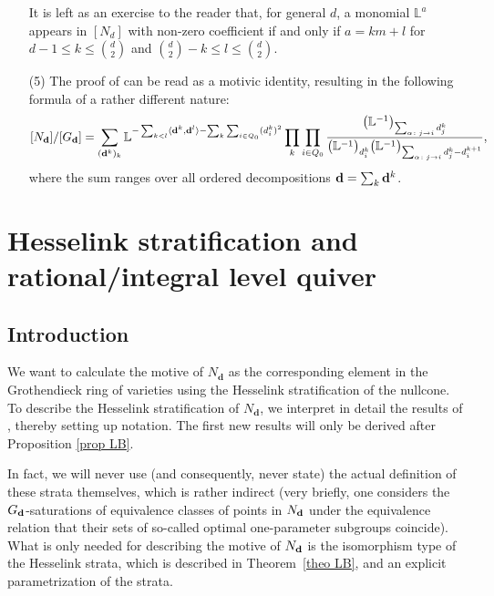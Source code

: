 \documentclass[10pt,a4paper]{amsart}
\numberwithin{equation}{section}
\theoremstyle{definition}
\begin{document}
\begin{enumerate}
It is left as an exercise to the reader that, for general $d$, a monomial $\mathbb{L}^a$ appears in $[N_d]$ with non-zero coefficient if and only if $a=km+l$ for $d-1\leq k\leq{d\choose 2}$ and ${d\choose 2}-k\leq l\leq{d\choose 2}$.
\item[(5)] The proof of \cite[Lemma~2.6]{BSV} can be read as a motivic identity, resulting in the following formula of a rather different nature:
\[[N_{\bf d}]/[G_{\bf d}]=\sum_{({\bf d}^k)_k}\mathbb{L}^{-\sum_{k<l}\langle{\bf d}^k,{\bf d}^l\rangle-\sum_k\sum_{i\in Q_0}(d^k_i)^2}\prod_k\prod_{i\in Q_0}\frac{\bigl(\mathbb{L}^{-1}\bigr)_{\sum_{\alpha\colon j\rightarrow i}d^k_j}}{\bigl(\mathbb{L}^{-1}\bigr)_{d^k_i}\bigl(\mathbb{L}^{-1}\bigr)_{\sum_{\alpha\colon j\rightarrow i}d^k_j-d^{k+1}_i}},\]
where the sum ranges over all ordered decompositions ${\bf d}=\sum_k{\bf d}^k$.
\end{enumerate}


\section{Hesselink stratification and rational/integral level quiver}\label{s4}


\subsection{Introduction}

We want to calculate the motive of $N_{\mathbf{d}}$ as the corresponding element in the Grothendieck ring of varieties using the Hesselink stratification of the nullcone. To describe the Hesselink stratification of $N_{\mathbf{d}}$, we interpret in detail the results of \cite{LB}, thereby setting up notation. The first new results will only be derived after Proposition \ref{prop LB}.

In fact, we will never use (and consequently, never state) the actual definition of these strata themselves, which is rather indirect (very briefly, one considers the $G_{\bf d}$-saturations of equivalence classes of points in $N_{\bf d}$ under the equivalence relation that their sets of so-called optimal one-parameter subgroups coincide). What is only needed for describing the motive of $N_{\bf d}$ is the isomorphism type of the Hesselink strata, which is described in Theorem~\ref{theo LB}, and an explicit parametrization of the strata.
\end{document}
